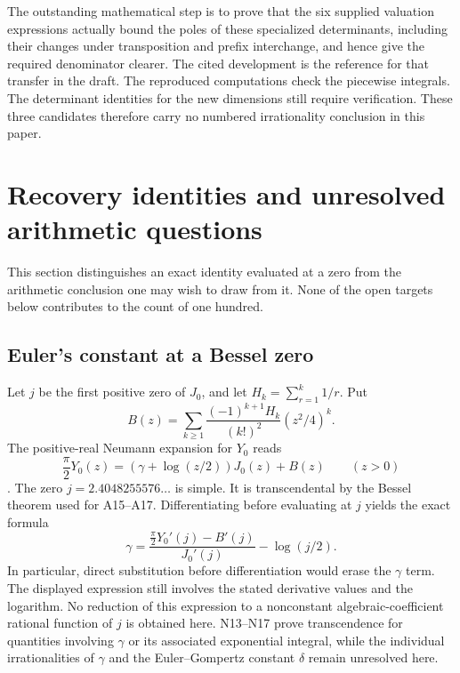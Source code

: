 \documentclass[11pt,a4paper]{article}
\theoremstyle{definition}
\theoremstyle{remark}
\begin{document}
The outstanding mathematical step is to prove that the six supplied
valuation expressions actually bound the poles of these specialized
determinants, including their changes under transposition and
prefix interchange, and hence give the required denominator clearer.
The cited development \cite{nLamSource} is the reference for that
transfer in the draft. The reproduced computations check the piecewise
integrals. The determinant identities for the new dimensions still require
verification. These three candidates therefore carry no numbered
irrationality conclusion in this paper.


\section{Recovery identities and unresolved arithmetic questions}\label{sec:open}
This section distinguishes an exact identity evaluated at a zero from the arithmetic conclusion one may wish to draw from it. None of the open targets below contributes to the count of one hundred.
\subsection{Euler's constant at a Bessel zero}\label{sec:euler}
Let $j$ be the first positive zero of $J_0$, and let $H_k=\sum_{r=1}^k1/r$. Put
\[
 B(z)=\sum_{k\ge1}\frac{(-1)^{k+1}H_k}{(k!)^2}(z^2/4)^k .
\]
The positive-real Neumann expansion for $Y_0$ reads
\[
 \frac{\pi}{2}Y_0(z)=(\gamma+\log(z/2))J_0(z)+B(z)
 \qquad(z>0)
\]
\cite[Eq.~10.8.2]{aDLMF}. The zero $j=2.4048255576\ldots$ is simple. It is transcendental by the Bessel theorem used for A15--A17. Differentiating before evaluating at $j$ yields the exact formula
\[
 \gamma=\frac{\frac\pi2Y_0'(j)-B'(j)}{J_0'(j)}-\log(j/2).
\]
In particular, direct substitution before differentiation would erase the $\gamma$ term. The displayed expression still involves the stated derivative values and the logarithm. No reduction of this expression to a nonconstant algebraic-coefficient rational function of $j$ is obtained here. N13--N17 prove transcendence for quantities involving $\gamma$ or its associated exponential integral, while the individual irrationalities of $\gamma$ and the Euler--Gompertz constant $\delta$ remain unresolved here.
\end{document}
